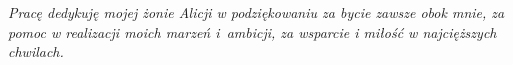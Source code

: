 \thispagestyle{empty}

\vspace*{20cm}
{\LARGE \textit{Pracę dedykuję mojej żonie Alicji w podziękowaniu za bycie zawsze obok mnie, za pomoc w realizacji moich marzeń i~ambicji, za wsparcie i miłość w najcięższych chwilach.}}